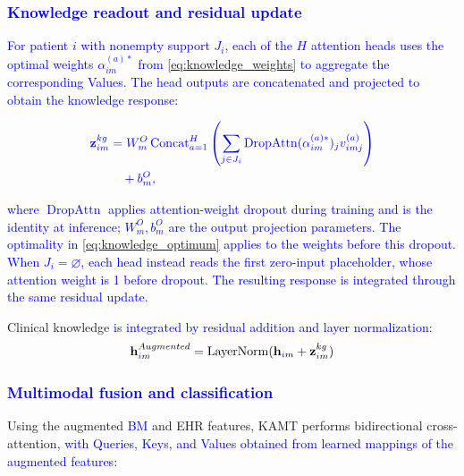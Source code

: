 \documentclass[lettersize,journal]{IEEEtran}
\begin{document}
\subsubsection{\textcolor{blue}{Knowledge readout and residual update}}

    \textcolor{blue}{For patient $i$ with nonempty support $J_i$, each of the $H$ attention heads uses the optimal weights $\alpha_{im}^{(a)*}$ from \cref{eq:knowledge_weights} to aggregate the corresponding Values. The head outputs are concatenated and projected to obtain the knowledge response:}
    
    \begin{equation}
        {\color{blue}
        \begin{aligned}
        \mathbf{z}_{im}^{kg}&=W_m^O\operatorname{Concat}_{a=1}^{H}\left(
        \sum_{j\in J_i}\operatorname{DropAttn}
        (\alpha_{im}^{(a)*})_j v_{imj}^{(a)}\right)\\
        &\quad+b_m^O,
        \end{aligned}
        }
        \label{eq:knowledge_response}
    \end{equation}

    \textcolor{blue}{where $\operatorname{DropAttn}$ applies attention-weight dropout during training and is the identity at inference; $W_m^O,b_m^O$ are the output projection parameters. The optimality in \cref{eq:knowledge_optimum} applies to the weights before this dropout.}
    \textcolor{blue}{When $J_i=\varnothing$, each head instead reads the first zero-input placeholder, whose attention weight is 1 before dropout. The resulting response is integrated through the same residual update.}

    Clinical knowledge \textcolor{blue}{is integrated by residual addition and layer normalization}:
    \begin{equation}
    \mathbf{h}_{\textcolor{blue}{i}m}^{Augmented} = \mathrm{LayerNorm}(\mathbf{h}_{\textcolor{blue}{i}m} + \mathbf{z}_{\textcolor{blue}{i}m}^{kg})
    \end{equation}

\subsubsection{\textcolor{blue}{Multimodal fusion and classification}}

    Using the augmented \textcolor{blue}{BM} and EHR features, KAMT performs bidirectional cross-attention\textcolor{blue}{, with Queries, Keys, and Values obtained from learned mappings of the augmented features}:
    
\end{document}
